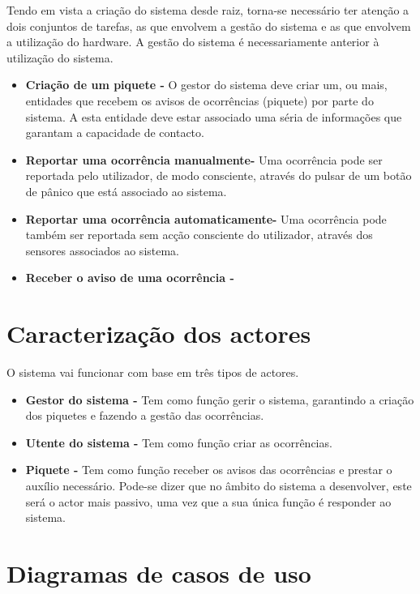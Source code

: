 Tendo em vista a criação do sistema desde raiz, torna-se necessário ter atenção a dois conjuntos de tarefas, as que envolvem a gestão do sistema e as que envolvem a utilização do hardware. A gestão do sistema é necessariamente anterior à utilização do sistema.
\begin{itemize}
	\item\textbf{Criação de um piquete -} O gestor do sistema deve criar um, ou mais, entidades que recebem os avisos de ocorrências (piquete) por parte do sistema. A esta entidade deve estar associado uma séria de informações que garantam a capacidade de contacto. 
	
	\item\textbf{Reportar uma ocorrência manualmente-} Uma ocorrência pode ser reportada pelo utilizador, de modo consciente, através do pulsar de um botão de pânico que está associado ao sistema.
	
	\item\textbf{Reportar uma ocorrência automaticamente-} Uma ocorrência pode também ser reportada sem acção consciente do utilizador, através dos sensores associados ao sistema. 
	
	\item\textbf{Receber o aviso de uma ocorrência - }
\end{itemize}

\section{Caracterização dos actores}

O sistema vai funcionar com base em três tipos de actores.

\begin{itemize}
	\item\textbf{Gestor do sistema - }Tem como função gerir o sistema, garantindo a criação dos piquetes e fazendo a gestão das ocorrências.
	
	\item\textbf{Utente do sistema - }Tem como função criar as ocorrências.
	
	\item\textbf{Piquete - }Tem como função receber os avisos das ocorrências e prestar o auxílio necessário. Pode-se dizer que no âmbito do sistema a desenvolver, este será o actor mais passivo, uma vez que a sua única função é responder ao sistema.
\end{itemize}

\section{Diagramas de casos de uso}

